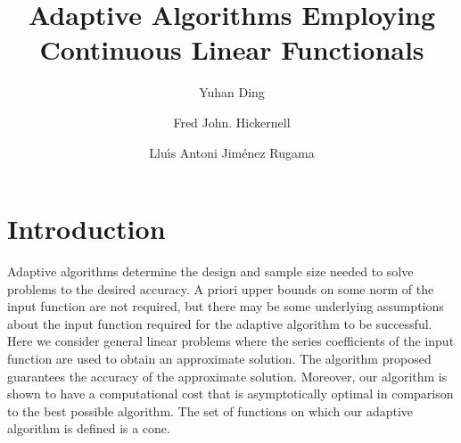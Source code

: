 \documentclass[final]{elsarticle}
\theoremstyle{definition}
\theoremstyle{remark}
\begin{document}
\begin{frontmatter}

\title{Adaptive Algorithms Employing Continuous Linear Functionals}
\author{Yuhan Ding}
\address{MCA 310, Department of Mathematics, Misericordia University,\\ 301 Lake St., Dallas, PA, 18612}
\author{Fred John. Hickernell}
\address{Center for Interdisciplinary Scientific Computation and \\
Department of Applied Mathematics, Illinois Institute of Technology \\ RE 208, 10 W.\ 32$^{\text{nd}}$ St., Chicago, IL 60616}
\author{Llu\'{\i}s Antoni Jim\'{e}nez Rugama}
\address{Department of Applied Mathematics, Illinois Institute of Technology,\\ RE 208, 10 W.\ 32$^{\text{nd}}$ St., Chicago, IL 60616}
\begin{abstract}
\end{abstract}

\begin{keyword}


\end{keyword}
\end{frontmatter}

\section{Introduction}
Adaptive algorithms determine the design and sample size needed to solve problems to the desired accuracy.  A priori upper bounds on some norm of the input function are not required, but there may be some underlying assumptions about the input function required for the adaptive algorithm to be successful.  Here we consider general linear problems where the series coefficients of the input function are used to obtain an approximate solution.  The algorithm proposed guarantees the accuracy of the approximate solution.  Moreover, our algorithm is shown to have a computational cost that is asymptotically optimal in comparison to the best possible algorithm.  The set of functions on which our adaptive algorithm is defined is a cone.
\end{document}

